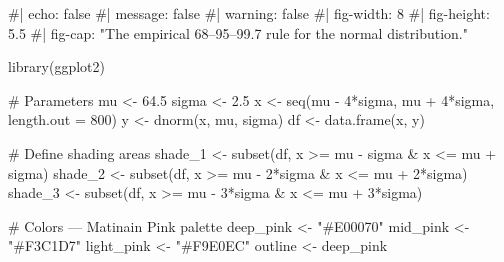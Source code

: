 \documentclass[
  letterpaper,
  DIV=11,
  numbers=noendperiod]{scrreprt}
\newenvironment{Shaded}{\begin{snugshade}}{\end{snugshade}}
\newcommand{\AttributeTok}[1]{\textcolor[rgb]{0.40,0.45,0.13}{#1}}
\newcommand{\CommentTok}[1]{\textcolor[rgb]{0.37,0.37,0.37}{#1}}
\newcommand{\DecValTok}[1]{\textcolor[rgb]{0.68,0.00,0.00}{#1}}
\newcommand{\FloatTok}[1]{\textcolor[rgb]{0.68,0.00,0.00}{#1}}
\newcommand{\FunctionTok}[1]{\textcolor[rgb]{0.28,0.35,0.67}{#1}}
\newcommand{\NormalTok}[1]{\textcolor[rgb]{0.00,0.23,0.31}{#1}}
\newcommand{\OtherTok}[1]{\textcolor[rgb]{0.00,0.23,0.31}{#1}}
\newcommand{\SpecialCharTok}[1]{\textcolor[rgb]{0.37,0.37,0.37}{#1}}
\newcommand{\StringTok}[1]{\textcolor[rgb]{0.13,0.47,0.30}{#1}}
\begin{document}
\begin{Shaded}
\begin{Highlighting}[]
\CommentTok{\#| echo: false}
\CommentTok{\#| message: false}
\CommentTok{\#| warning: false}
\CommentTok{\#| fig{-}width: 8}
\CommentTok{\#| fig{-}height: 5.5}
\CommentTok{\#| fig{-}cap: "The empirical 68–95–99.7 rule for the normal distribution."}

\FunctionTok{library}\NormalTok{(ggplot2)}

\CommentTok{\# Parameters}
\NormalTok{mu }\OtherTok{\textless{}{-}} \FloatTok{64.5}
\NormalTok{sigma }\OtherTok{\textless{}{-}} \FloatTok{2.5}
\NormalTok{x }\OtherTok{\textless{}{-}} \FunctionTok{seq}\NormalTok{(mu }\SpecialCharTok{{-}} \DecValTok{4}\SpecialCharTok{*}\NormalTok{sigma, mu }\SpecialCharTok{+} \DecValTok{4}\SpecialCharTok{*}\NormalTok{sigma, }\AttributeTok{length.out =} \DecValTok{800}\NormalTok{)}
\NormalTok{y }\OtherTok{\textless{}{-}} \FunctionTok{dnorm}\NormalTok{(x, mu, sigma)}
\NormalTok{df }\OtherTok{\textless{}{-}} \FunctionTok{data.frame}\NormalTok{(x, y)}

\CommentTok{\# Define shading areas}
\NormalTok{shade\_1 }\OtherTok{\textless{}{-}} \FunctionTok{subset}\NormalTok{(df, x }\SpecialCharTok{\textgreater{}=}\NormalTok{ mu }\SpecialCharTok{{-}}\NormalTok{ sigma }\SpecialCharTok{\&}\NormalTok{ x }\SpecialCharTok{\textless{}=}\NormalTok{ mu }\SpecialCharTok{+}\NormalTok{ sigma)}
\NormalTok{shade\_2 }\OtherTok{\textless{}{-}} \FunctionTok{subset}\NormalTok{(df, x }\SpecialCharTok{\textgreater{}=}\NormalTok{ mu }\SpecialCharTok{{-}} \DecValTok{2}\SpecialCharTok{*}\NormalTok{sigma }\SpecialCharTok{\&}\NormalTok{ x }\SpecialCharTok{\textless{}=}\NormalTok{ mu }\SpecialCharTok{+} \DecValTok{2}\SpecialCharTok{*}\NormalTok{sigma)}
\NormalTok{shade\_3 }\OtherTok{\textless{}{-}} \FunctionTok{subset}\NormalTok{(df, x }\SpecialCharTok{\textgreater{}=}\NormalTok{ mu }\SpecialCharTok{{-}} \DecValTok{3}\SpecialCharTok{*}\NormalTok{sigma }\SpecialCharTok{\&}\NormalTok{ x }\SpecialCharTok{\textless{}=}\NormalTok{ mu }\SpecialCharTok{+} \DecValTok{3}\SpecialCharTok{*}\NormalTok{sigma)}

\CommentTok{\# Colors — Matinain Pink palette}
\NormalTok{deep\_pink }\OtherTok{\textless{}{-}} \StringTok{"\#E00070"}
\NormalTok{mid\_pink  }\OtherTok{\textless{}{-}} \StringTok{"\#F3C1D7"}
\NormalTok{light\_pink }\OtherTok{\textless{}{-}} \StringTok{"\#F9E0EC"}
\NormalTok{outline }\OtherTok{\textless{}{-}}\NormalTok{ deep\_pink}


\end{Highlighting}
\end{Shaded}
\end{document}
